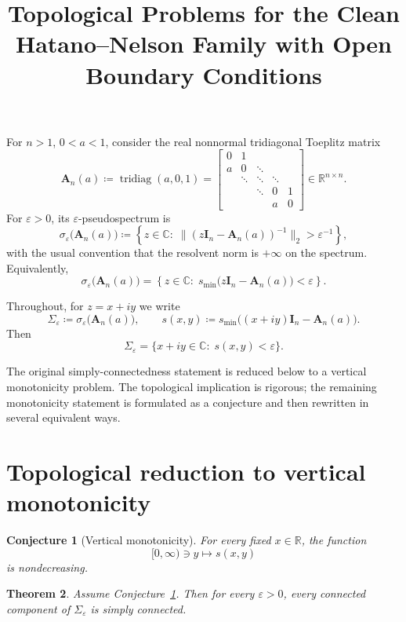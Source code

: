 \documentclass[11pt]{article}
\title{Topological Problems for the Clean Hatano--Nelson Family with Open Boundary Conditions}
\author{}
\date{}
\newtheorem{theorem}{Theorem}
\newtheorem{conjecture}[theorem]{Conjecture}
\begin{document}
\maketitle

For \(n>1\), \(0<a<1\), consider the real nonnormal tridiagonal Toeplitz matrix
\[
\mathbf{A}_n(a)\coloneqq \operatorname{tridiag}(a,0,1)
=
\begin{bmatrix}
0 & 1 \\
a & 0 & \ddots \\
& \ddots & \ddots & \ddots \\
&& \ddots & 0 & 1 \\
&&& a & 0
\end{bmatrix}\in \mathbb{R}^{n\times n}.
\]
For \(\varepsilon>0\), its \(\varepsilon\)-pseudospectrum is
\[
\sigma_\varepsilon\bigl(\mathbf{A}_n(a)\bigr)
\coloneqq
\left\{
z\in\mathbb C:\;
\bigl\|(z\mathbf I_n-\mathbf A_n(a))^{-1}\bigr\|_2>\varepsilon^{-1}
\right\},
\]
with the usual convention that the resolvent norm is \(+\infty\) on the spectrum. Equivalently,
\[
\sigma_\varepsilon\bigl(\mathbf A_n(a)\bigr)
=
\left\{
z\in\mathbb C:\;
s_{\min}\!\bigl(z\mathbf I_n-\mathbf A_n(a)\bigr)<\varepsilon
\right\}.
\]

Throughout, for \(z=x+iy\) we write
\[
\Sigma_\varepsilon\coloneqq \sigma_\varepsilon\bigl(\mathbf A_n(a)\bigr),
\qquad
s(x,y)\coloneqq s_{\min}\!\bigl((x+iy)\mathbf I_n-\mathbf A_n(a)\bigr).
\]
Then
\[
\Sigma_\varepsilon=\{x+iy\in\mathbb C:\; s(x,y)<\varepsilon\}.
\]

The original simply-connectedness statement is reduced below to a vertical monotonicity problem. The topological implication is rigorous; the remaining monotonicity statement is formulated as a conjecture and then rewritten in several equivalent ways.

\section{Topological reduction to vertical monotonicity}

\begin{conjecture}[Vertical monotonicity]\label{conj:vertical-monotonicity}
For every fixed \(x\in\mathbb R\), the function
\[
[0,\infty)\ni y\longmapsto s(x,y)
\]
is nondecreasing.
\end{conjecture}

\begin{theorem}\label{thm:components-simply-connected}
Assume Conjecture~\ref{conj:vertical-monotonicity}. Then for every \(\varepsilon>0\), every connected component of \(\Sigma_\varepsilon\) is simply connected.
\end{theorem}
\end{document}
